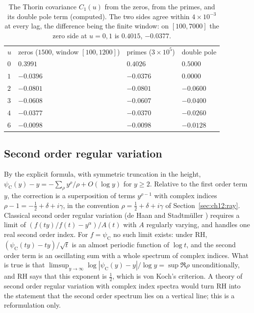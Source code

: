 \begin{table}[ht]
\centering
\begin{tabular}{llll}
$u$ & zeros ($1500$, window $[100,1200]$) & primes ($3\times10^5$) & double pole \\
$0$ & $0.3991$ & $0.4026$ & $0.5000$ \\
$1$ & $-0.0396$ & $-0.0376$ & $0.0000$ \\
$2$ & $-0.0801$ & $-0.0801$ & $-0.0600$ \\
$3$ & $-0.0608$ & $-0.0607$ & $-0.0400$ \\
$4$ & $-0.0377$ & $-0.0370$ & $-0.0260$ \\
$6$ & $-0.0098$ & $-0.0098$ & $-0.0128$
\end{tabular}
\caption{The Thorin covariance $C_1(u)$ from the zeros, from the primes, and its double pole term (computed). The two sides agree within $4\times10^{-3}$ at every lag, the difference being the finite window: on $[100,7000]$ the zero side at $u=0,1$ is $0.4015$, $-0.0377$.}\label{wt:tab:cov}
\end{table}

\subsection{Second order regular variation}

By the explicit formula, with symmetric truncation in the height, $\psi_{\mathrm C}(y)-y=-\sum_\rho y^\rho/\rho+O(\log y)$ for $y\ge2$. Relative to the first order term $y$, the correction is a superposition of terms $y^{\rho-1}$ with complex indices $\rho-1=-\frac12+\delta+i\gamma$, in the convention $\rho=\frac12+\delta+i\gamma$ of Section~\ref{sec:ch12:ray}. Classical second order regular variation (de Haan and Stadtm\"uller \cite{deHaanStadtmuller96}) requires a limit of $(f(ty)/f(t)-y^{\alpha})/A(t)$ with $A$ regularly varying, and handles one real second order index. For $f=\psi_{\mathrm C}$ no such limit exists: under RH, $(\psi_{\mathrm C}(ty)-ty)/\sqrt t$ is an almost periodic function of $\log t$, and the second order term is an oscillating sum with a whole spectrum of complex indices. What is true is that $\limsup_{y\to\infty}\log|\psi_{\mathrm C}(y)-y|/\log y=\sup\Re\rho$ unconditionally, and RH says that this exponent is $\frac12$, which is von Koch's criterion. A theory of second order regular variation with complex index spectra would turn RH into the statement that the second order spectrum lies on a vertical line; this is a reformulation only.
